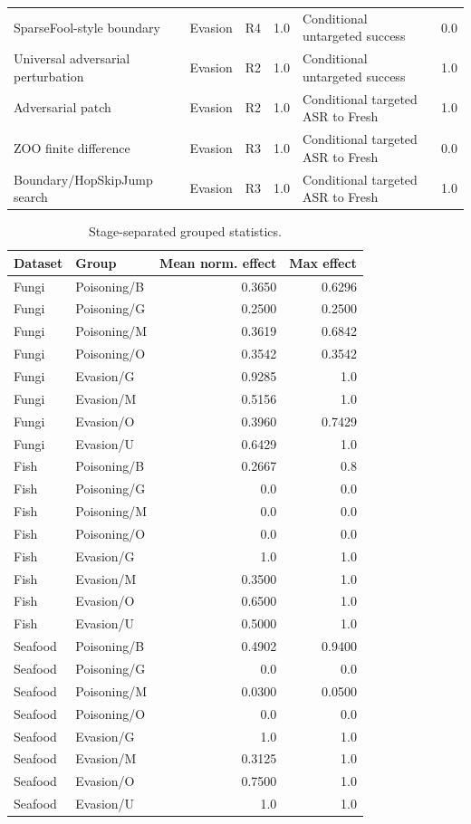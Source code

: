 \documentclass[conference]{IEEEtran}
\begin{document}
\begin{table}[t]
\begin{tabular}{p{}p{}p{}p{}p{}p{}}
SparseFool-style boundary & Evasion & R4 & 1.0 & Conditional untargeted success & 0.0 \\
Universal adversarial perturbation & Evasion & R2 & 1.0 & Conditional untargeted success & 1.0 \\
Adversarial patch & Evasion & R2 & 1.0 & Conditional targeted ASR to Fresh & 1.0 \\
ZOO finite difference & Evasion & R3 & 1.0 & Conditional targeted ASR to Fresh & 0.0 \\
Boundary/HopSkipJump search & Evasion & R3 & 1.0 & Conditional targeted ASR to Fresh & 1.0 \\
\bottomrule
\end{tabular}
\end{table}

\begin{table}[t]
\centering
\caption{Stage-separated grouped statistics.}
\label{tab:groupstats}
\small
\begin{tabular}{llrr}
\toprule
Dataset & Group & Mean norm. effect & Max effect \\
\midrule
Fungi & Poisoning/B & 0.3650 & 0.6296 \\
Fungi & Poisoning/G & 0.2500 & 0.2500 \\
Fungi & Poisoning/M & 0.3619 & 0.6842 \\
Fungi & Poisoning/O & 0.3542 & 0.3542 \\
Fungi & Evasion/G & 0.9285 & 1.0 \\
Fungi & Evasion/M & 0.5156 & 1.0 \\
Fungi & Evasion/O & 0.3960 & 0.7429 \\
Fungi & Evasion/U & 0.6429 & 1.0 \\
Fish & Poisoning/B & 0.2667 & 0.8 \\
Fish & Poisoning/G & 0.0 & 0.0 \\
Fish & Poisoning/M & 0.0 & 0.0 \\
Fish & Poisoning/O & 0.0 & 0.0 \\
Fish & Evasion/G & 1.0 & 1.0 \\
Fish & Evasion/M & 0.3500 & 1.0 \\
Fish & Evasion/O & 0.6500 & 1.0 \\
Fish & Evasion/U & 0.5000 & 1.0 \\
Seafood & Poisoning/B & 0.4902 & 0.9400 \\
Seafood & Poisoning/G & 0.0 & 0.0 \\
Seafood & Poisoning/M & 0.0300 & 0.0500 \\
Seafood & Poisoning/O & 0.0 & 0.0 \\
Seafood & Evasion/G & 1.0 & 1.0 \\
Seafood & Evasion/M & 0.3125 & 1.0 \\
Seafood & Evasion/O & 0.7500 & 1.0 \\
Seafood & Evasion/U & 1.0 & 1.0 \\
\bottomrule
\end{tabular}
\end{table}
\end{document}
